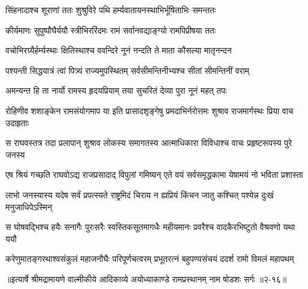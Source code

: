\twolineshloka
{सिंहनादाश्च शूराणां ततः शुश्रुविरे पथि}
{हर्म्यवातायनस्थाभिर्भूषिताभिः समन्ततः} %

\twolineshloka
{कीर्यमाणः सुपुष्पौघैर्ययौ स्त्रीभिररिंदमः}
{रामं सर्वानवद्याङ्ग्यो रामपिप्रीषया ततः} %

\twolineshloka
{वचोभिरग्र्यैर्हर्म्यस्थाः क्षितिस्थाश्च ववन्दिरे}
{नूनं नन्दति ते माता कौसल्या मातृनन्दन} %

\twolineshloka
{पश्यन्ती सिद्धयात्रं त्वां पित्र्यं राज्यमुपस्थितम्}
{सर्वसीमन्तिनीभ्यश्च सीतां सीमन्तिनीं वराम्} %

\twolineshloka
{अमन्यन्त हि ता नार्यो रामस्य हृदयप्रियाम्}
{तया सुचरितं देव्या पुरा नूनं महत् तपः} %

\threelineshloka
{रोहिणीव शशाङ्केन रामसंयोगमाप या}
{इति प्रासादशृङ्गेषु प्रमदाभिर्नरोत्तमः}
{शुश्राव राजमार्गस्थः प्रिया वाच उदाहृताः} %

\twolineshloka
{स राघवस्तत्र तदा प्रलापान् शुश्राव लोकस्य समागतस्य}
{आत्माधिकारा विविधाश्च वाचः प्रहृष्टरूपस्य पुरे जनस्य} %

\twolineshloka
{एष श्रियं गच्छति राघवोऽद्य राजप्रसादाद् विपुलां गमिष्यन्}
{एते वयं सर्वसमृद्धकामा येषामयं नो भविता प्रशास्ता} %

\twolineshloka
{लाभो जनस्यास्य यदेष सर्वं प्रपत्स्यते राष्ट्रमिदं चिराय}
{न ह्यप्रियं किंचन जातु कश्चित् पश्येन्न दुःखं मनुजाधिपेऽस्मिन्} %

\twolineshloka
{स घोषवद्भिश्च हयैः सनागैः पुरःसरैः स्वस्तिकसूतमागधैः}
{महीयमानः प्रवरैश्च वादकैरभिष्टुतो वैश्रवणो यथा ययौ} %

\twolineshloka
{करेणुमातङ्गरथाश्वसंकुलं महाजनौघैः परिपूर्णचत्वरम्}
{प्रभूतरत्नं बहुपण्यसंचयं ददर्श रामो विमलं महापथम्} %


॥इत्यार्षे श्रीमद्रामायणे वाल्मीकीये आदिकाव्ये अयोध्याकाण्डे रामप्रस्थानम् नाम षोडशः सर्गः ॥२-१६॥
